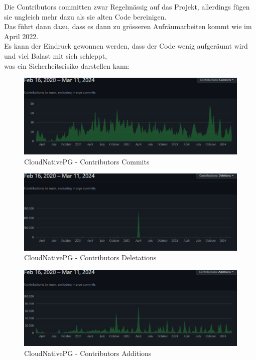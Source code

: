 \begin{flushleft}
    Die Contributors committen zwar Regelmässig auf das Projekt, allerdings fügen sie ungleich mehr dazu als sie alten Code bereinigen.\\
    Das führt dann dazu, dass es dann zu grösseren Aufräumarbeiten kommt wie im April 2022.\\
    Es kann der Eindruck gewonnen werden, dass der Code wenig aufgeräumt wird und viel Balast mit sich schleppt,\\
    was ein Sicherheitsrisiko darstellen kann:
    \begin{figure}[H]
        \centering
        \includegraphics[width=0.75\linewidth]{source/implementation/evaluation/postgresql_ha_solutions/insights/cloudnativepg/contributors_commits_cloudnative-pg_cloudnative-pg}
        \caption{CloudNativePG - Contributors Commits}
        \label{fig:contributors_commits_cloudnative-pg_cloudnative-pg}
    \end{figure}
    \begin{figure}[H]
        \centering
        \includegraphics[width=0.75\linewidth]{source/implementation/evaluation/postgresql_ha_solutions/insights/cloudnativepg/contributors_deletations_cloudnative-pg_cloudnative-pg}
        \caption{CloudNativePG - Contributors Deletations}
        \label{fig:contributors_deletations_cloudnative-pg_cloudnative-pg}
    \end{figure}
    \begin{figure}[H]
        \centering
        \includegraphics[width=0.75\linewidth]{source/implementation/evaluation/postgresql_ha_solutions/insights/cloudnativepg/contributors_additions_cloudnative-pg_cloudnative-pg}
        \caption{CloudNativePG - Contributors Additions}
        \label{fig:contributors_additions_cloudnative-pg_cloudnative-pg}
    \end{figure}


\end{flushleft}
